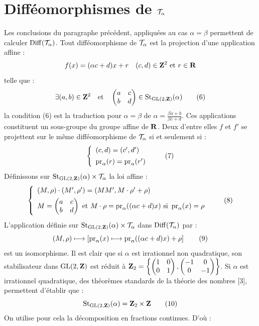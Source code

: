 \documentclass[10pt]{amsart}
\renewcommand{\Torus}{\cT}
\begin{document}
  \section*{Difféomorphismes de $\Torus_{\alpha}$}
  Les conclusions du paragraphe précédent,
  appliquées au cas $\alpha = \beta$ permettent de calculer $\Diff(\Torus_{\alpha})$.
  Tout difféomorphisme de $\Torus_{\alpha}$ est la projection d'une application affine :
  $$
    f(x) = (\alpha c + d) x + r \quad (c, d) \in {\mathbf{Z}}^{2} \text{ et } r \in {\mathbf{R}}
    $$
  telle que :
  \begin{equation}
    \exists (a, b) \in {\mathbf{Z}}^{2} \quad \text{et} \quad \begin{pmatrix}  a & c \\ b & d  \end{pmatrix} \in \mathrm{St}_{\mathrm{GL}(2, {\mathbf{Z}})}(\alpha) \tag{6}
  \end{equation}
  la condition (6) est la traduction pour $\alpha = \beta$ de $\alpha = \frac{\beta a + b}{\beta c + d}$.
  Ces applications constituent un sous-groupe du groupe affine de ${\mathbf{R}}$.
  Deux d'entre elles $f$ et $f'$ se projettent sur le même difféomorphisme de $\Torus_{\alpha}$ si et seulement si :
  \begin{equation}
    \left\{
    \begin{array}{l}
      (c, d) = (c^{\prime}, d^{\prime}) \\ [1ex]
      \Proj_{\alpha}(r) = \Proj_{\alpha}(r^{\prime})
    \end{array}
    \right. \tag{7}
  \end{equation}
  Définissons sur $\Stab_{\GL(2, \ringZ)}(\alpha) \times \Torus_{\alpha}$ la loi affine :
  \begin{equation}
    \left\{
    \begin{array}{l}
      (M, \rho) \cdot (M^{\prime}, \rho^{\prime}) = (M M^{\prime}, M \cdot \rho^{\prime} + \rho) \\ [1ex]
      M = \Matrix{ a & c \\ b & d } \text{ et } M \cdot \rho = \Proj_{\alpha}((\alpha c + d) x) \text{ si } \Proj_{\alpha}(x) = \rho
    \end{array}
    \right. \tag{8}
  \end{equation}
  L'application définie sur $\Stab_{\GL(2, \ringZ)}(\alpha) \times \Torus_{\alpha}$ dans $\Diff(\Torus_{\alpha})$ par :
  \begin{equation}
    (M, \rho) \longmapsto \left[ \Proj_{\alpha}(x) \longmapsto \Proj_{\alpha}((\alpha c + d) x) + \rho \right] \tag{9}
  \end{equation}
  est un isomorphisme.
  Il est clair que si $\alpha$ est irrationnel non quadratique,
  son stabilisateur dans $\mathrm{GL}(2, {\mathbf{Z}})$ est réduit à ${\mathbf{Z}}_{2} = \left\{ \begin{pmatrix}  1 & 0 \\ 0 & 1  \end{pmatrix}, \begin{pmatrix}  -1 & 0 \\ 0 & -1  \end{pmatrix} \right\}$.
  Si $\alpha$ est irrationnel quadratique,
  des théorèmes standards de la théorie des nombres [3],
  permettent d'établir que :
  \begin{equation}
    \mathrm{St}_{\mathrm{GL}(2, {\mathbf{Z}})}(\alpha) = {\mathbf{Z}}_{2} \times {\mathbf{Z}} \tag{10}
  \end{equation}
  On utilise pour cela la décomposition en fractions continues.
  D'où :
  
\end{document}
